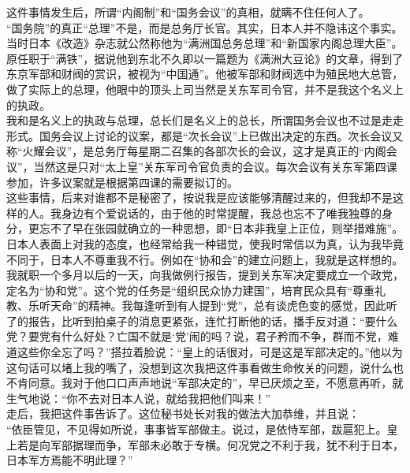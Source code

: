 这件事情发生后，所谓“内阁制”和“国务会议”的真相，就瞒不住任何人了。\\

“国务院”的真正“总理”不是，而是总务厅长官。其实，日本人并不隐讳这个事实。当时日本《改造》杂志就公然称他为“满洲国总务总理”和“新国家内阁总理大臣”。原任职于“满铁”，据说他到东北不久即以一篇题为《满洲大豆论》的文章，得到了东京军部和财阀的赏识，被视为“中国通”。他被军部和财阀选中为殖民地大总管，做了实际上的总理，他眼中的顶头上司当然是关东军司令官，并不是我这个名义上的执政。\\

我和是名义上的执政与总理，总长们是名义上的总长，所谓国务会议也不过是走走形式。国务会议上讨论的议案，都是“次长会议”上已做出决定的东西。次长会议又称“火耀会议”，是总务厅每星期二召集的各部次长的会议，这才是真正的“内阁会议”，当然这是只对“太上皇”关东军司令官负责的会议。每次会议有关东军第四课参加，许多议案就是根据第四课的需要拟订的。\\

这些事情，后来对谁都不是秘密了，按说我是应该能够清醒过来的，但我却不是这样的人。我身边有个爱说话的，由于他的时常提醒，我总也忘不了唯我独尊的身分，更忘不了早在张园就确立的一种思想，即“日本非我皇上正位，则举措难施”。日本人表面上对我的态度，也经常给我一种错觉，使我时常信以为真，认为我毕竟不同于，日本人不尊重我不行。例如在“协和会”的建立问题上，我就是这样想的。\\

我就职一个多月以后的一天，向我做例行报告，提到关东军决定要成立一个政党，定名为“协和党”。这个党的任务是“组织民众协力建国”，培育民众具有“尊重礼教、乐听天命”的精神。我每逢听到有人提到“党”，总有谈虎色变的感觉，因此听了的报告，比听到拍桌子的消息更紧张，连忙打断他的话，播手反对道：“要什么党？要党有什么好处？亡国不就是‘党’闹的吗？说，君子矜而不争，群而不党，难道这些你全忘了吗？”搭拉着脸说：“皇上的话很对，可是这是军部决定的。”他以为这句话可以堵上我的嘴了，没想到这次我把这件事看做生命攸关的问题，说什么也不肯同意。我对于他口口声声地说“军部决定的”，早已厌烦之至，不愿意再听，就生气地说：“你不去对日本人说，就给我把他们叫来！”\\

走后，我把这件事告诉了。这位秘书处长对我的做法大加恭维，并且说：\\

“依臣管见，不见得如所说，事事皆军部做主。说过，是依恃军部，跋扈犯上。皇上若是向军部据理而争，军部未必敢于专横。何况党之不利于我，犹不利于日本，日本军方焉能不明此理？”\\

